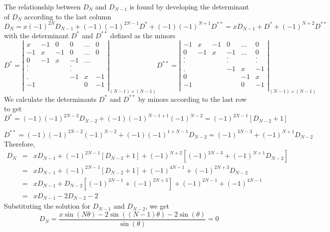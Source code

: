 \documentclass[12pt]{report}
\begin{document}
The relationship between $D_N$ and $D_{N-1}$ is found by developing the determinant of $D_N$ according to the last column
\begin{equation*}
D_N = x(-1)^{2N}D_{N-1}+(-1)(-1)^{2N-1}D^*+(-1)(-1)^{N+1}D^{**}=xD_{N-1}+D^*+(-1)^{N+2}D^{**}
\end{equation*}
with the determinant $D^*$ and $D^{**}$ defined as the minors 
\begin{equation*}
D^*= 
\left| \begin{matrix}
 x  & -1 &  0 &  0  &... &  0 \\
-1  &  x & -1 &  0  &... &  0 \\
 0  & -1 &  x & -1  &... &    \\
 .  &    &    &  .  &    &    \\
 .  &    &    &  .  &    &    \\
 .  &    &    &  -1 &  x &-1  \\
 -1 &    &    &     &  0 &-1  \\   
\end{matrix}\right|_{(N-1)\times(N-1)} 
D^{**}=\left|\begin{matrix}
-1  &  x & -1 &  0  &...&  0 \\
 0  & -1 &  x & -1  &...&  0 \\
 .  &    &    &  .  &   &  . \\
 .  &    &    &  .  &   &  . \\
 .  &    &    &  -1 &  x& -1 \\
 0  &    &    &     & -1& x  \\
 -1 &    &    &     &  0&-1  \\   
\end{matrix} \right|_{(N-1)\times(N-1)}
\end{equation*}
We calculate the determinants $D^*$ and $D^{**}$ by minors according to the last row to get 
\begin{equation*}
D^* = (-1)(-1)^{2N-2}D_{N-2}+(-1)(-1)^{N-1+1}(-1)^{N-2}=(-1)^{2N-1}[D_{N-2}+1]
\end{equation*}

\begin{equation*}
D^{**}=(-1)(-1)^{2N-2}(-1)^{N-2} +(-1)(-1)^{1+N-1}D_{N-2}=(-1)^{3N-3}+(-1)^{N+1}D_{N-2}
\end{equation*}
Therefore, 
\begin{eqnarray*}
D_N & = & xD_{N-1} + (-1)^{2N-1}[D_{N-2}+1]+(-1)^{N+2}[(-1)^{3N-3}+(-1)^{N+1}D_{N-2}]\\
    & = & xD_{N-1} + (-1)^{2N-1}[D_{N-2}+1]+(-1)^{4N-1}+(-1)^{2N+3}D_{N-2}\\
    & = & xD_{N-1} + D_{N-2}[(-1)^{2N-1}+(-1)^{2N+3}]+(-1)^{2N-1}+(-1)^{4N-1}\\
    & = & xD_{N-1} - 2D_{N-2}-2
\end{eqnarray*}
Substituting the solution for $D_{N-1}$ and $D_{N-2}$, we get 
\begin{equation*}
D_N = \frac{x\sin(N\theta)-2\sin((N-1)\theta)-2\sin(\theta)}{\sin(\theta)}=0
\end{equation*}
\end{document}
